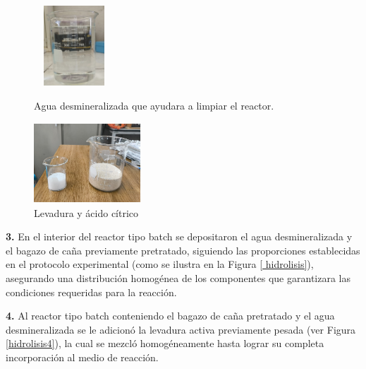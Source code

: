 \documentclass[12pt]{article}
\begin{document}
		 \begin{figure}[H]
		 	\centering
		 	\begin{minipage}{0.46\textwidth}
		 		\centering
		 		\includegraphics[width=3cm, height=3cm]{imagenes/agua} %
		 		\caption{ Agua desmineralizada que ayudara a limpiar el reactor.}
		 		\label{agua}
		 	\end{minipage}
		 	\hfill
		 	\begin{minipage}{0.48\textwidth}
		 		\centering
		 		\includegraphics[width=4cm, height=3cm]{imagenes/levadura y acido citrico} %
		 		\caption{Levadura y ácido cítrico}
		 		\label{pesado2}
		 	\end{minipage}
		 \end{figure}
		 
		 
	     \textbf{3.} En el interior del reactor tipo batch se depositaron el agua desmineralizada y el bagazo de caña previamente pretratado, siguiendo las proporciones establecidas en el protocolo experimental (como se ilustra en la Figura \ref{ hidrolisis}), asegurando una distribución homogénea de los componentes que garantizara las condiciones requeridas para la reacción.
	     	
	     \textbf{4.} Al reactor tipo batch conteniendo el bagazo de caña pretratado y el agua desmineralizada se le adicionó la levadura activa previamente pesada (ver Figura \ref{hidrolisis4}), la cual se mezcló homogéneamente hasta lograr su completa incorporación al medio de reacción. 
	     
	    
	     
\end{document}
